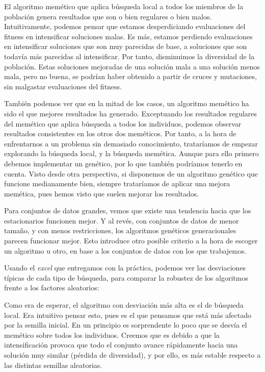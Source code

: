 \documentclass[11pt]{article}
\begin{document}
El algoritmo memético que aplica búsqueda local a todos los miembros de la población genera resultados que son o bien regulares o bien malos. Intuitivamente, podemos pensar que estamos desperdiciando evaluaciones del fitness en intensificar soluciones malas. Es más, estamos perdiendo evaluaciones en intensificar soluciones que son muy parecidas de base, a soluciones que son todavía más parecidas al intensificar. Por tanto, disminuimos la diversidad de la población. Estas soluciones mejoradas de una solución mala a una solución menos mala, pero no buena, se podrían haber obtenido a partir de cruces y mutaciones, sin malgastar evaluaciones del fitness.

También podemos ver que en la mitad de los casos, un algoritmo memético ha sido el que mejores resultados ha generado. Exceptuando los resultados regulares del memético que aplica búsqueda a todos los individuos, podemos observar resultados consistentes en los otros dos meméticos. Por tanto, a la hora de enfrentarnos a un problema sin demasiado conocimiento, trataríamos de empezar explorando la búsqueda local, y la búsqueda memética. Aunque para ello primero debemos implementar un genético, por lo que también podríamos tenerlo en cuenta. Visto desde otra perspectiva, si disponemos de un algoritmo genético que funcione medianamente bien, siempre trataríamos de aplicar una mejora memética, pues hemos visto que suelen mejorar los resultados.

Para conjuntos de datos grandes, vemos que existe una tendencia hacia que los estacionarios funcionen mejor. Y al revés, con conjuntos de datos de menor tamaño, y con menos restricciones, los algoritmos genéticos generacionales parecen funcionar mejor. Esto introduce otro posible criterio a la hora de escoger un algoritmo u otro, en base a los conjuntos de datos con los que trabajemos.

Usando el \emph{excel} que entregamos con la práctica, podemos ver las desviaciones típicas de cada tipo de búsqueda, para comparar la robustez de los algoritmos frente a los factores aleatorios:


Como era de esperar, el algoritmo con desviación más alta es el de búsqueda local. Era intuitivo pensar esto, pues es el que pensamos que está más afectado por la semilla inicial. En un principio es sorprendente lo poco que se desvía el memético sobre todos los individuos. Creemos que es debido a que la intensificación provoca que todo el conjunto avance rápidamente hacia una solución muy similar (pérdida de diversidad), y por ello, es más estable respecto a las distintas semillas aleatorias.
\end{document}
